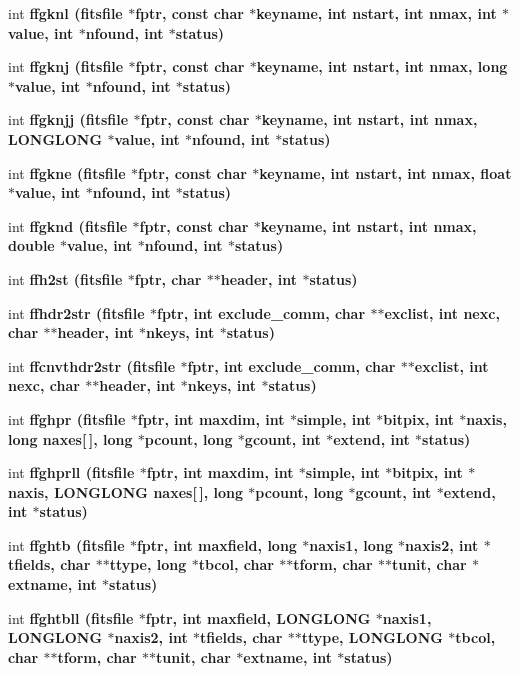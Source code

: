 \begin{CompactItemize}
int \bf{ffgknl} (\bf{fitsfile} $\ast$fptr, const char $\ast$keyname, int nstart, int nmax, int $\ast$value, int $\ast$nfound, int $\ast$status)
\item 
int \bf{ffgknj} (\bf{fitsfile} $\ast$fptr, const char $\ast$keyname, int nstart, int nmax, long $\ast$value, int $\ast$nfound, int $\ast$status)
\item 
int \bf{ffgknjj} (\bf{fitsfile} $\ast$fptr, const char $\ast$keyname, int nstart, int nmax, \bf{LONGLONG} $\ast$value, int $\ast$nfound, int $\ast$status)
\item 
int \bf{ffgkne} (\bf{fitsfile} $\ast$fptr, const char $\ast$keyname, int nstart, int nmax, float $\ast$value, int $\ast$nfound, int $\ast$status)
\item 
int \bf{ffgknd} (\bf{fitsfile} $\ast$fptr, const char $\ast$keyname, int nstart, int nmax, double $\ast$value, int $\ast$nfound, int $\ast$status)
\item 
int \bf{ffh2st} (\bf{fitsfile} $\ast$fptr, char $\ast$$\ast$header, int $\ast$status)
\item 
int \bf{ffhdr2str} (\bf{fitsfile} $\ast$fptr, int exclude\_\-comm, char $\ast$$\ast$exclist, int nexc, char $\ast$$\ast$header, int $\ast$nkeys, int $\ast$status)
\item 
int \bf{ffcnvthdr2str} (\bf{fitsfile} $\ast$fptr, int exclude\_\-comm, char $\ast$$\ast$exclist, int nexc, char $\ast$$\ast$header, int $\ast$nkeys, int $\ast$status)
\item 
int \bf{ffghpr} (\bf{fitsfile} $\ast$fptr, int maxdim, int $\ast$simple, int $\ast$bitpix, int $\ast$naxis, long naxes[$\,$], long $\ast$pcount, long $\ast$gcount, int $\ast$extend, int $\ast$status)
\item 
int \bf{ffghprll} (\bf{fitsfile} $\ast$fptr, int maxdim, int $\ast$simple, int $\ast$bitpix, int $\ast$naxis, \bf{LONGLONG} naxes[$\,$], long $\ast$pcount, long $\ast$gcount, int $\ast$extend, int $\ast$status)
\item 
int \bf{ffghtb} (\bf{fitsfile} $\ast$fptr, int maxfield, long $\ast$naxis1, long $\ast$naxis2, int $\ast$tfields, char $\ast$$\ast$ttype, long $\ast$tbcol, char $\ast$$\ast$tform, char $\ast$$\ast$tunit, char $\ast$extname, int $\ast$status)
\item 
int \bf{ffghtbll} (\bf{fitsfile} $\ast$fptr, int maxfield, \bf{LONGLONG} $\ast$naxis1, \bf{LONGLONG} $\ast$naxis2, int $\ast$tfields, char $\ast$$\ast$ttype, \bf{LONGLONG} $\ast$tbcol, char $\ast$$\ast$tform, char $\ast$$\ast$tunit, char $\ast$extname, int $\ast$status)
\item 
$$
\end{CompactItemize}
